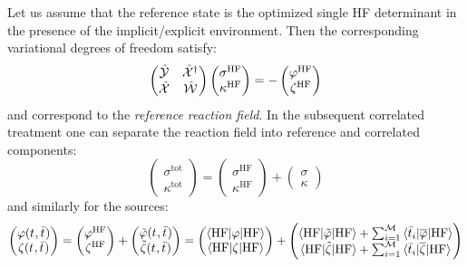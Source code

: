 Let us assume that the reference state is the optimized single \acs{HF}
determinant in the presence of the implicit/explicit environment.
Then the corresponding variational degrees of freedom satisfy:
\begin{equation}
  \begin{pmatrix}
    \hat{\mathcal{Y}} & \hat{\mathcal{X}}^\dagger \\
    \hat{\mathcal{X}} & \hat{\mathcal{W}}
  \end{pmatrix}
  \begin{pmatrix}
   \sigma^\mathrm{HF} \\
   \kappa^\mathrm{HF}
  \end{pmatrix}
  =
  -
  \begin{pmatrix}
   \varphi^\mathrm{HF} \\
   \zeta^\mathrm{HF}
  \end{pmatrix}
\end{equation}
and correspond to the \emph{reference reaction field}.
In the subsequent correlated treatment one can separate the reaction
field into reference and correlated components:
\begin{equation}
  \begin{pmatrix}
   \sigma^\mathrm{tot} \\
   \kappa^\mathrm{tot}
  \end{pmatrix}
  =
  \begin{pmatrix}
   \sigma^\mathrm{HF} \\
   \kappa^\mathrm{HF}
  \end{pmatrix}
  +
  \begin{pmatrix}
   \sigma \\
   \kappa
  \end{pmatrix}
\end{equation}
and similarly for the sources:
\begin{equation}
  \begin{pmatrix}
   \varphi(t_{}, \bar{t}_{}) \\
   \zeta(t_{}, \bar{t}_{})
  \end{pmatrix}
  =
  \begin{pmatrix}
   \varphi^\mathrm{HF} \\
   \zeta^\mathrm{HF}
  \end{pmatrix}
  +
  \begin{pmatrix}
    \tilde{\varphi}(t_{}, \bar{t}_{}) \\
   \tilde{\zeta}(t_{}, \bar{t}_{})
  \end{pmatrix}
  =
  \begin{pmatrix}
  \braket{\mathrm{HF} | \varphi  | \mathrm{HF}} \\
  \braket{\mathrm{HF} | \zeta | \mathrm{HF}}
  \end{pmatrix}
  +
  \begin{pmatrix}
   \braket{\mathrm{HF} | \tilde{\varphi} | \mathrm{HF}}
  + \sum_{i=1}^{\mathcal{M}}\braket{\bar{t}_{i} | \overline{\varphi} | \mathrm{HF}} \\
   \braket{\mathrm{HF} | \tilde{\zeta} | \mathrm{HF}}
  + \sum_{i=1}^{\mathcal{M}}\braket{\bar{t}_{i} | \overline{\zeta} | \mathrm{HF}}
  \end{pmatrix}
\end{equation}
